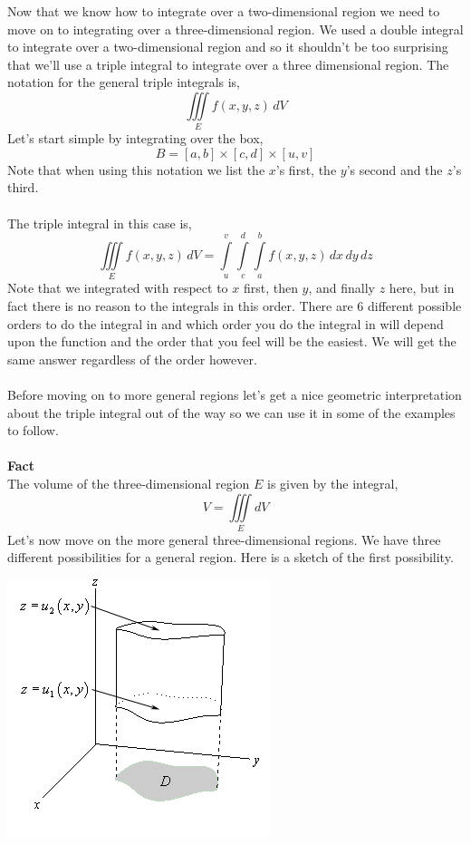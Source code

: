 \documentclass[10pt,reqno]{book}
\theoremstyle{definition}
\begin{document}
	Now that we know how to integrate over a two-dimensional region we need to move on to integrating over a three-dimensional region. We used a double integral to integrate over a two-dimensional region and so it shouldn't be too surprising that we'll use a triple integral to integrate over a three dimensional region. The notation for the general triple integrals is,
	\[ \iiint\limits_E f(x,y,z)\,dV \]
	Let's start simple by integrating over the box,
	\[ B = [a,b] \times [c,d] \times [u,v] \]
	Note that when using this notation we list the $ x $'s first, the $ y $'s second and the $ z $'s third.\\ \\
	The triple integral in this case is,
	\[ \iiint\limits_E f(x,y,z)\,dV = \int\limits_u^v \int\limits_c^d \int\limits_a^b f(x,y,z)\,dx\,dy\,dz \]
	Note that we integrated with respect to $ x $ first, then $ y $, and finally $ z $ here, but in fact there is no reason to the integrals in this order. There are 6 different possible orders to do the integral in and which order you do the integral in will depend upon the function and the order that you feel will be the easiest. We will get the same answer regardless of the order however.\\ \\
	Before moving on to more general regions let's get a nice geometric interpretation about the triple integral out of the way so we can use it in some of the examples to follow.\\ \\
	\textbf{Fact}\\
	The volume of the three-dimensional region $ E $ is given by the integral,
	\[ V = \iiint\limits_E dV \]
	Let's now move on the more general three-dimensional regions. We have three different possibilities for a general region. Here is a sketch of the first possibility.
	\begin{center}
		\includegraphics[scale=0.6]{trip1.png}
	\end{center}
\end{document}
